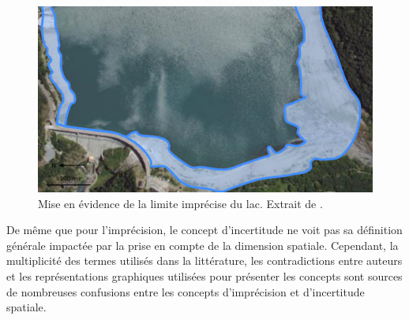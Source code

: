 \begin{figure}
  \centering
  \includegraphics{../figures/fig3.png}
  \caption{Mise en évidence de la limite imprécise du lac. Extrait de
    \textcite{Bunel2020}.}
  \label{fig:lim_champ_imp}
\end{figure}

De même que pour l’imprécision, le concept d’incertitude ne voit pas
sa définition générale impactée par la prise en compte de la dimension
spatiale. Cependant, la multiplicité des termes utilisés dans la
littérature, les contradictions entre auteurs et les représentations
graphiques utilisées pour présenter les concepts sont sources de
nombreuses confusions entre les concepts d’imprécision et
d’incertitude spatiale.

